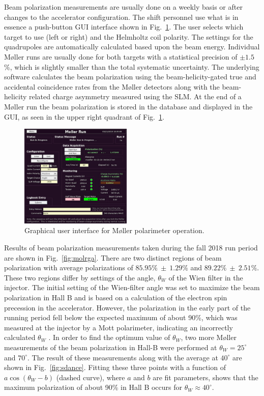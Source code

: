 Beam polarization measurements are usually done on a weekly basis or after changes to the accelerator configuration.  The shift personnel
use what is in essence a push-button GUI interface shown in Fig.~\ref{fig:mollergui}. The user selects which target to use (left or right) and the
Helmholtz coil polarity. The settings for the quadrupoles are automatically calculated based upon the beam energy. Individual M{\o}ller runs
are usually done for both targets with a statistical precision of $\pm 1.5$\%, which is slightly smaller than the total systematic uncertainty. 
The underlying software calculates the beam polarization using the beam-helicity-gated true and accidental coincidence rates from 
the M{\o}ller detectors along with the beam-helicity related charge asymmetry measured using the SLM. 
At the end of a M{\o}ller run the beam polarization is stored in the database and displayed in the GUI, as seen in the upper right quadrant 
of  Fig.~\ref{fig:mollergui}. 

\begin{figure}[ht]
\begin{center}
\includegraphics[width=0.475\textwidth]{moller_gui.pdf}
	\caption{Graphical user interface for M{\o}ller polarimeter operation.}
\label{fig:mollergui}
\end{center}
\end{figure}

Results of beam polarization measurements taken during the fall 2018 run period are shown in Fig.~\ref{fig:molrga}.
There are two distinct regions of beam polarization with average polarizations of $85.95\% ~\pm ~1.29\%$ and $89.22\%~\pm~2.51\%$. 
These two regions differ by settings of the angle, $\theta_W$ of the Wien filter in the injector. The initial setting of the Wien-filter angle was 
set to maximize the beam polarization in Hall B and is based on a calculation of the electron spin precession in the accelerator. 
However, the polarization in the early part of the running period fell below the expected maximum of about 90\%, which was measured 
at the injector by a Mott polarimeter, indicating an incorrectly calculated $\theta_W$ . In order to find the optimum value of $\theta_W$, 
two more M{\o}ller measurements of the beam polarization in Hall-B were performed at $\theta_W=25^\circ$ and $70^\circ$.  
The result of these measurements along with the average at $40^\circ$ are shown in Fig.~\ref{fig:sdance}. Fitting these three points 
with a function of $a\cos\left(\theta_W-b\right)$ (dashed curve), where $a$ and $b$ are fit parameters,  shows that the maximum
 polarization of about 90\% in Hall B occurs for $\theta_W\approx 40^\circ$.
 

